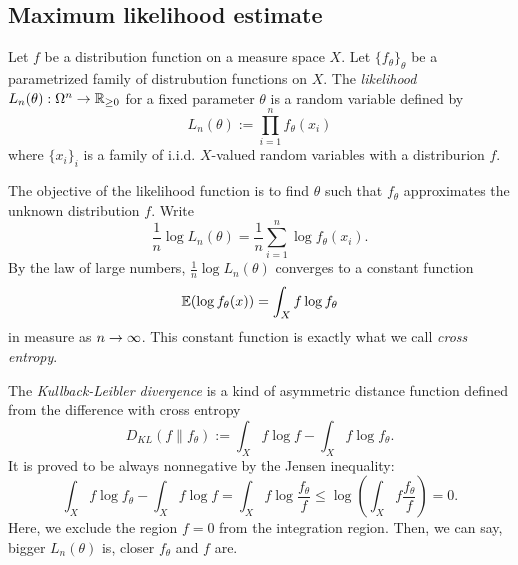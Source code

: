 \documentclass{../exp}
\begin{document}
\subsection{Maximum likelihood estimate}
\begin{defn}
Let $f$ be a distribution function on a measure space $X$.
Let $\{f_\theta\}_\theta$ be a parametrized family of distrubution functions on $X$.
The \emph{likelihood} $L_n(\theta):\Omega^n\to\R_{\ge0}$ for a fixed parameter $\theta$ is a random variable defined by
\[L_n(\theta):=\prod_{i=1}^nf_\theta(x_i)\]
where $\{x_i\}_i$ is a family of i.i.d. $X$-valued random variables with a distriburion $f$.
\end{defn}
The objective of the likelihood function is to find $\theta$ such that $f_\theta$ approximates the unknown distribution $f$.
Write
\[\frac1n\log L_n(\theta)=\frac1n\sum_{i=1}^n\log f_\theta(x_i).\]
By the law of large numbers, $\frac1n\log L_n(\theta)$ converges to a constant function
\[\mathbb{E}(\log f_\theta(x))=\int_Xf\log f_\theta\]
in measure as $n\to\oo$.
This constant function is exactly what we call \emph{cross entropy}.

The \emph{Kullback-Leibler divergence} is a kind of asymmetric distance function defined from the difference with cross entropy
\[D_{KL}(f\|f_\theta):=\int_Xf\log f-\int_Xf\log f_\theta.\]
It is proved to be always nonnegative by the Jensen inequality: 
\[\int_Xf\log f_\theta-\int_Xf\log f=\int_Xf\log\frac{f_\theta}f\le\log\left(\int_Xf\frac{f_\theta}f\right)=0.\]
Here, we exclude the region $f=0$ from the integration region.
Then, we can say, bigger $L_n(\theta)$ is, closer $f_\theta$ and $f$ are.












\iffalse
\section{Generative adversarial networks}
Let $X$ be the set of all images having a given pixel size.
Suppose the data distribution $p_{data}$ on $X$ which embodies learning materials is given.
If $x\in X$ is an image that looks like a real human face, then the distribution(mass) function $p_{data}$ has nonnegligible values near the point $x$.
We cannot describe the distribution function $p_{data}$ completely, but only can sample from it.

Let $p_g$ be a distribution on $X$.
The generator $G:\Omega\to X$ is just an arbitrarily taken random variable satisfying $p_g$ for sampling.
The discriminator $D:X\to[0,1]$ is a function
Our purpose is to construct a new method for approximating $p_g\to p_{data}$ by simultaneously updating the discriminator function $D$.

Let $x_i\sim p_{data}$ and $z\sim p_g$ be random variables $\Omega\to X$.
Let $D$ maximize
\[\log D(x)+\log(1-D(z))\]
and $p_g$ minimize
\[\log(1-D(z)).\]


Balancing the convergence rates between $p_g$ and $D$ is important.
\fi
\end{document}
